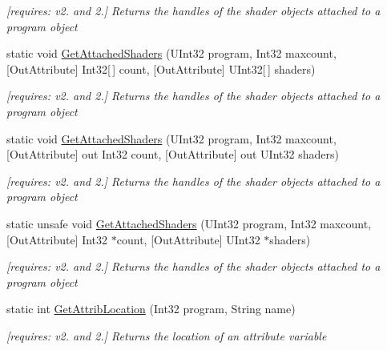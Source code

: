 \begin{DoxyCompactItemize}
\begin{DoxyCompactList}\small\item\em \mbox{[}requires\-: v2. and 2.\mbox{]} Returns the handles of the shader objects attached to a program object \end{DoxyCompactList}\item 
static void \hyperlink{class_open_t_k_1_1_graphics_1_1_e_s20_1_1_g_l_ae799c6b0100f8ed5db691f5e70ac5d7a}{Get\-Attached\-Shaders} (U\-Int32 program, Int32 maxcount, \mbox{[}Out\-Attribute\mbox{]} Int32\mbox{[}$\,$\mbox{]} count, \mbox{[}Out\-Attribute\mbox{]} U\-Int32\mbox{[}$\,$\mbox{]} shaders)
\begin{DoxyCompactList}\small\item\em \mbox{[}requires\-: v2. and 2.\mbox{]} Returns the handles of the shader objects attached to a program object \end{DoxyCompactList}\item 
static void \hyperlink{class_open_t_k_1_1_graphics_1_1_e_s20_1_1_g_l_ae14df63574d33816f4084b18421937cd}{Get\-Attached\-Shaders} (U\-Int32 program, Int32 maxcount, \mbox{[}Out\-Attribute\mbox{]} out Int32 count, \mbox{[}Out\-Attribute\mbox{]} out U\-Int32 shaders)
\begin{DoxyCompactList}\small\item\em \mbox{[}requires\-: v2. and 2.\mbox{]} Returns the handles of the shader objects attached to a program object \end{DoxyCompactList}\item 
static unsafe void \hyperlink{class_open_t_k_1_1_graphics_1_1_e_s20_1_1_g_l_a5a12fa525ee62e766c3802ed3c8eb141}{Get\-Attached\-Shaders} (U\-Int32 program, Int32 maxcount, \mbox{[}Out\-Attribute\mbox{]} Int32 $\ast$count, \mbox{[}Out\-Attribute\mbox{]} U\-Int32 $\ast$shaders)
\begin{DoxyCompactList}\small\item\em \mbox{[}requires\-: v2. and 2.\mbox{]} Returns the handles of the shader objects attached to a program object \end{DoxyCompactList}\item 
static int \hyperlink{class_open_t_k_1_1_graphics_1_1_e_s20_1_1_g_l_ad85ecce38595aa5459be503c3564fbca}{Get\-Attrib\-Location} (Int32 program, String name)
\begin{DoxyCompactList}\small\item\em \mbox{[}requires\-: v2. and 2.\mbox{]} Returns the location of an attribute variable \end{DoxyCompactList}\item 

\end{DoxyCompactItemize}
